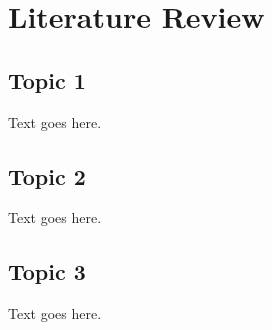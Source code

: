 \chapter{Literature Review}


\section{Topic 1}

Text goes here.

\section{Topic 2}

Text goes here.

\section{Topic 3}

Text goes here.

